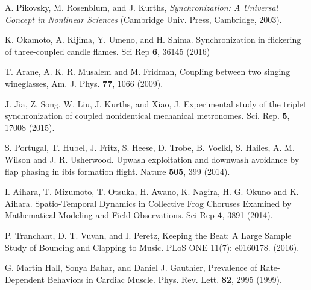 \documentclass[twocolumn,preprintnumbers,amsmath,amssymb,aps,prx]{revtex4}
\begin{document}
\begin{thebibliography}{99}

  
 A. Pikovsky, M. Rosenblum, and J. Kurths, {\it Synchronization: A Universal Concept in Nonlinear Sciences} (Cambridge Univ. Press, Cambridge, 2003).
  
 K. Okamoto, A. Kijima, Y. Umeno, and H. Shima. Synchronization in flickering of three-coupled candle flames. Sci Rep {\bf 6}, 36145 (2016)

 T. Arane, A. K. R. Musalem and M. Fridman, Coupling between two singing wineglasses, Am. J. Phys. {\bf 77}, 1066 (2009). %
  
  J. Jia, Z. Song, W. Liu, J. Kurths, and Xiao, J. Experimental study of the triplet synchronization of coupled nonidentical mechanical metronomes. Sci. Rep. {\bf 5}, 17008 (2015).

  
  
 S. Portugal, T. Hubel, J. Fritz, S. Heese, D. Trobe, B. Voelkl, S. Hailes, A. M. Wilson and J. R. Usherwood.  Upwash exploitation and downwash avoidance by flap phasing in ibis formation flight. Nature {\bf 505}, 399 (2014).

   I. Aihara, T. Mizumoto, T. Otsuka, H. Awano, K. Nagira, H. G. Okuno and K. Aihara. Spatio-Temporal Dynamics in Collective Frog Choruses Examined by Mathematical Modeling and Field Observations. Sci Rep {\bf 4}, 3891 (2014). 

   P. Tranchant, D. T. Vuvan, and I. Peretz, Keeping the Beat: A Large Sample Study of Bouncing and Clapping to Music. PLoS ONE 11(7): e0160178. (2016).

   G. Martin Hall, Sonya Bahar, and Daniel J. Gauthier, Prevalence of Rate-Dependent Behaviors in Cardiac Muscle. Phys. Rev. Lett. {\bf 82}, 2995 (1999).


\end{thebibliography}
\end{document}
